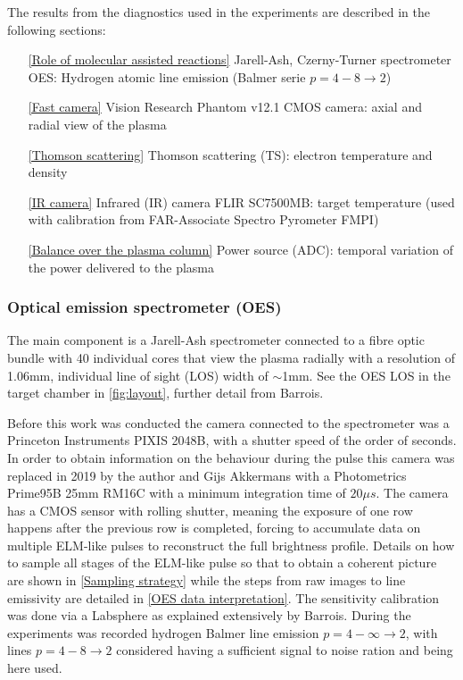 The results from the diagnostics used in the experiments are described in the following sections:
\begin{enumerate}
    \item[\ref{Role of molecular assisted reactions}] Jarell-Ash, Czerny-Turner spectrometer OES: Hydrogen atomic line emission (Balmer serie $p=4-8 \rightarrow 2$)
    \item[\ref{Fast camera}] Vision Research Phantom v12.1 CMOS camera: axial and radial view of the plasma
    \item[\ref{Thomson scattering}] Thomson scattering (TS): electron temperature and density
    \item[\ref{IR camera}] Infrared (IR) camera FLIR SC7500MB: target temperature (used with calibration from FAR-Associate Spectro Pyrometer FMPI)
    \item[\ref{Balance over the plasma column}] Power source (ADC): temporal variation of the power delivered to the plasma
\end{enumerate}

\subsubsection{Optical emission spectrometer (OES)}\label{Optical emission spectrometer}

The main component is a Jarell-Ash spectrometer connected to a fibre optic bundle with 40 individual cores that view the plasma radially with a resolution of 1.06mm, individual line of sight (LOS) width of $\sim$1mm. See the OES LOS in the target chamber in \autoref{fig:layout}, further detail from Barrois. \cite{Science2017}

Before this work was conducted the camera connected to the spectrometer was a Princeton Instruments PIXIS 2048B, with a shutter speed of the order of seconds. In order to obtain information on the behaviour during the pulse this camera was replaced in 2019 by the author and Gijs Akkermans with a Photometrics Prime95B 25mm RM16C with a minimum integration time of $20\mu s$. The camera has a CMOS sensor with rolling shutter, meaning the exposure of one row happens after the previous row is completed, forcing to accumulate data on multiple ELM-like pulses to reconstruct the full brightness profile. Details on how to sample all stages of the ELM-like pulse so that to obtain a coherent picture are shown in \autoref{Sampling strategy} while the steps from raw images to line emissivity are detailed in \ref{OES data interpretation}. The sensitivity calibration was done via a Labsphere as explained extensively by Barrois. \cite{Science2017} During the experiments was recorded hydrogen Balmer line emission $p=4-\infty \rightarrow 2$, with lines $p=4-8 \rightarrow 2$ considered having a sufficient signal to noise ration and being here used.

